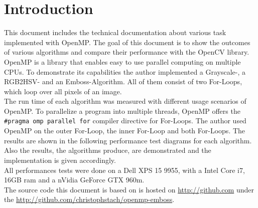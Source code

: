\chapter{Introduction}

This document includes the technical documentation about various task implemented with OpenMP. The goal of this document is to show the outcomes of various algorithms and compare their performance with the OpenCV library. OpenMP is a library that enables easy to use parallel computing on multiple CPUs. To demonstrate its capabilities the author implemented a Grayscale-, a RGB2HSV- and an Emboss-Algorithm. All of them consist of two For-Loops, which loop over all pixels of an image.\\

The run time of each algorithm was measured with different usage scenarios of OpenMP. To parallelize a program into multiple threads, OpenMP offers the \texttt{#pragma omp parallel for} compiler directive for For-Loops.  The author used OpenMP on the outer For-Loop, the inner For-Loop and both For-Loops. The results are shown in the following performance test diagrams for each algorithm. Also the results, the algorithms produce, are demonstrated and the implementation is given accordingly.\\

All performances tests were done on a Dell XPS 15 9955, with a Intel Core i7, 16GB ram and a nVidia GeForce GTX 960m.\\

The source code this document is based on is hosted on \url{http://github.com} under the \url{http://github.com/christophstach/openmp-emboss}.

